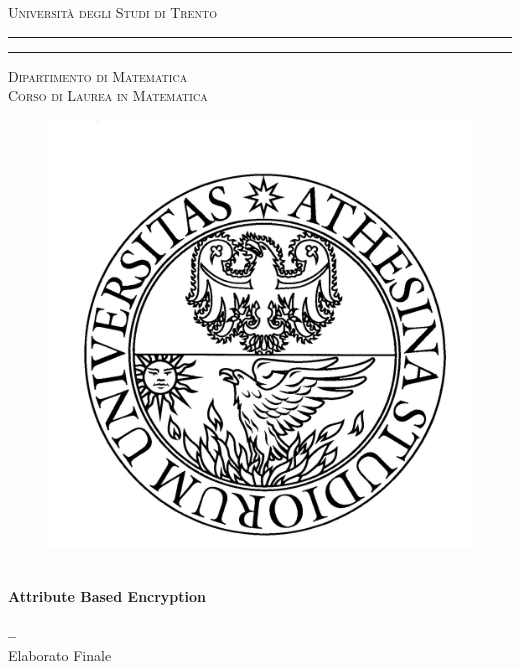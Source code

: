 \documentclass[a4paper,10pt, openright]{book}%
\theoremstyle{plain}%
\theoremstyle{definition}
\theoremstyle{remark}
\begin{document}
\frontmatter
\begin{titlepage}
\begin{center}
{{\Large{\textsc{Università degli Studi di Trento}}}}
\rule[0.1cm]{15.8cm}{0.1mm}
\rule[0.5cm]{15.8cm}{0.6mm}
{\small{\textsc { Dipartimento di Matematica \\
Corso di Laurea in Matematica}}}
\end{center}
\begin{center}
\begin{figure}[!htbp]
\includegraphics[scale=0.35]{unitn.jpg} \centering 
\centering
\end{figure}
\vspace{10mm}
\begin{center}
{\LARGE{\bf \-}}\\
\vspace{3mm}
{\LARGE\textbf{Attribute Based Encryption}}\\
\vspace{3mm}
{\LARGE{\bf \-}}\\
\vspace{3mm}
{\LARGE{\bf --}}\\
\vspace{7mm} {\large{\sc Elaborato Finale}}
\end{center}
\vfill
\par
\noindent

\end{center}
\end{titlepage}
\end{document}
